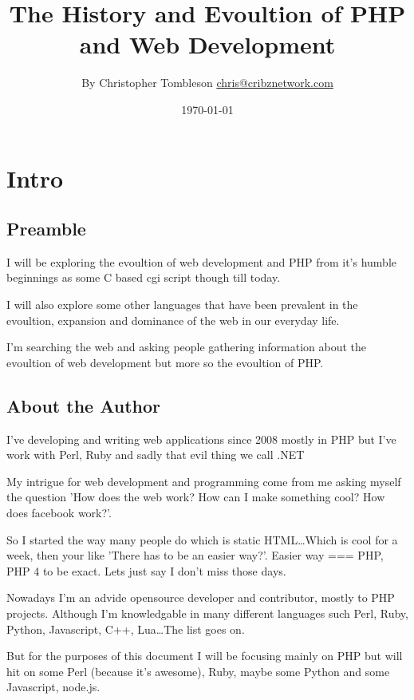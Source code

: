 \documentclass{book}
\begin{document}
\title{The History and Evoultion of PHP and Web Development}
\author{By Christopher Tombleson \href{mailto:chris@cribznetwork.com}{chris@cribznetwork.com}}
\date{\today}
\maketitle

\tableofcontents

\chapter{Intro}
\section{Preamble}
I will be exploring the evoultion of web development and PHP from it's humble beginnings as some C based cgi script though till today.

I will also explore some other languages that have been prevalent in the evoultion, expansion and dominance of the web in our everyday life.

I'm searching the web and asking people gathering information about the evoultion of web development but more so the evoultion of PHP.

\section{About the Author}

I've developing and writing web applications since 2008 mostly in PHP but I've work with Perl, Ruby and sadly that evil thing we call .NET

My intrigue for web development and programming come from me asking myself the question 'How does the web work? How can I make something cool? How does facebook work?'.

So I started the way many people do which is static HTML\ldots{}Which is cool for a week, then your like 'There has to be an easier way?'. Easier way === PHP, PHP 4 to be exact. Lets just say I don't miss those days.

Nowadays I'm an advide opensource developer and contributor, mostly to PHP projects. Although I'm knowledgable in many different languages such Perl, Ruby, Python, Javascript, C++, Lua\ldots{}The list goes on.

But for the purposes of this document I will be focusing mainly on PHP but will hit on some Perl (because it's awesome), Ruby, maybe some Python and some Javascript, node.js.
\end{document}
